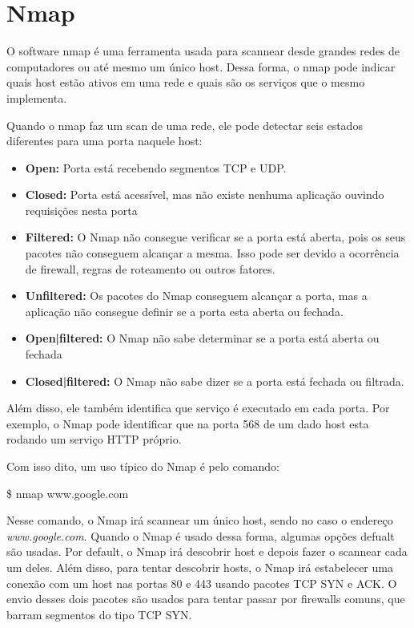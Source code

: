 \section{Nmap}

O software nmap é uma ferramenta usada para scannear desde grandes redes de
computadores ou até mesmo um único host. Dessa forma, o nmap pode indicar quais
host estão ativos em uma rede e quais são os serviços que o mesmo implementa.

Quando o nmap faz um scan de uma rede, ele pode detectar seis estados diferentes
para uma porta naquele host:

\begin{itemize}
    \item \textbf{Open:} Porta está recebendo segmentos TCP e UDP.
    \item \textbf{Closed:} Porta está acessível, mas não existe nenhuma
    aplicação ouvindo requisições nesta porta
    \item \textbf{Filtered:} O Nmap não consegue verificar se a porta está
    aberta, pois os seus pacotes não conseguem alcançar a mesma. Isso pode ser
    devido a ocorrência de firewall, regras de roteamento ou outros fatores.
    \item \textbf{Unfiltered:} Os pacotes do Nmap conseguem alcançar a porta,
    mas a aplicação não consegue definir se a porta esta aberta ou fechada.
    \item \textbf{Open|filtered:} O Nmap não sabe determinar se a porta está
    aberta ou fechada
    \item \textbf{Closed|filtered:} O Nmap não sabe dizer se a porta está
    fechada ou filtrada.
\end{itemize}

Além disso, ele também identifica que serviço é executado em cada porta. Por exemplo, o Nmap pode identificar
que na porta 568 de um dado host esta rodando um serviço HTTP próprio.

Com isso dito, um uso típico do Nmap é pelo comando:

\$ nmap www.google.com

Nesse comando, o Nmap irá scannear um único host, sendo no caso o endereço
\textit{www.google.com}. Quando o Nmap é usado dessa forma, algumas opções
defualt são usadas. Por default, o Nmap irá descobrir host e depois fazer o
scannear cada um deles. Além disso, para tentar descobrir hosts, o Nmap irá 
estabelecer uma conexão com um host nas portas 80 e 443 usando pacotes TCP SYN e ACK.
O envio desses dois pacotes são usados para tentar passar por firewalls comuns, que barram
segmentos do tipo TCP SYN.

